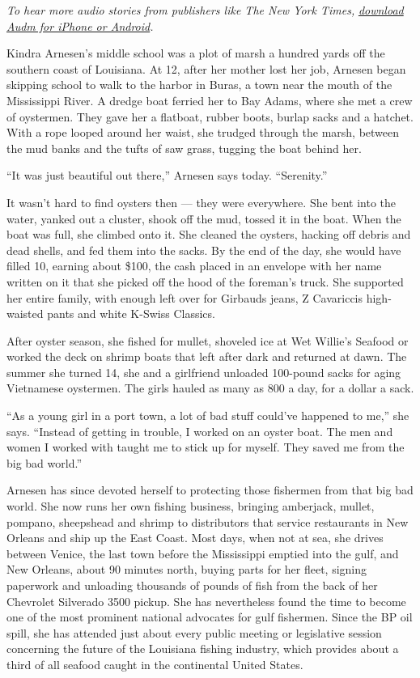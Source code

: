 \emph{To hear more audio stories from publishers like The New York
Times,}
\emph{\href{https://www.audm.com/?utm_source=nytmag\&utm_medium=embed\&utm_campaign=sacrificial_lands_louisiana}{download
Audm for iPhone or Android}.}

Kindra Arnesen's middle school was a plot of marsh a hundred yards off
the southern coast of Louisiana. At 12, after her mother lost her job,
Arnesen began skipping school to walk to the harbor in Buras, a town
near the mouth of the Mississippi River. A dredge boat ferried her to
Bay Adams, where she met a crew of oystermen. They gave her a flatboat,
rubber boots, burlap sacks and a hatchet. With a rope looped around her
waist, she trudged through the marsh, between the mud banks and the
tufts of saw grass, tugging the boat behind her.

``It was just beautiful out there,'' Arnesen says today. ``Serenity.''

It wasn't hard to find oysters then --- they were everywhere. She bent
into the water, yanked out a cluster, shook off the mud, tossed it in
the boat. When the boat was full, she climbed onto it. She cleaned the
oysters, hacking off debris and dead shells, and fed them into the
sacks. By the end of the day, she would have filled 10, earning about
\$100, the cash placed in an envelope with her name written on it that
she picked off the hood of the foreman's truck. She supported her entire
family, with enough left over for Girbauds jeans, Z Cavariccis
high-waisted pants and white K-Swiss Classics.

After oyster season, she fished for mullet, shoveled ice at Wet Willie's
Seafood or worked the deck on shrimp boats that left after dark and
returned at dawn. The summer she turned 14, she and a girlfriend
unloaded 100-pound sacks for aging Vietnamese oystermen. The girls
hauled as many as 800 a day, for a dollar a sack.

``As a young girl in a port town, a lot of bad stuff could've happened
to me,'' she says. ``Instead of getting in trouble, I worked on an
oyster boat. The men and women I worked with taught me to stick up for
myself. They saved me from the big bad world.''

Arnesen has since devoted herself to protecting those fishermen from
that big bad world. She now runs her own fishing business, bringing
amberjack, mullet, pompano, sheepshead and shrimp to distributors that
service restaurants in New Orleans and ship up the East Coast. Most
days, when not at sea, she drives between Venice, the last town before
the Mississippi emptied into the gulf, and New Orleans, about 90 minutes
north, buying parts for her fleet, signing paperwork and unloading
thousands of pounds of fish from the back of her Chevrolet Silverado
3500 pickup. She has nevertheless found the time to become one of the
most prominent national advocates for gulf fishermen. Since the BP oil
spill, she has attended just about every public meeting or legislative
session concerning the future of the Louisiana fishing industry, which
provides about a third of all seafood caught in the continental United
States.

